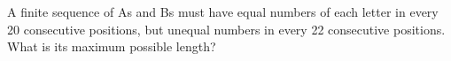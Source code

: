 A finite sequence of As and Bs must have equal numbers of each letter in every 20 consecutive positions, but unequal numbers in every 22 consecutive positions. What is its maximum possible length?

